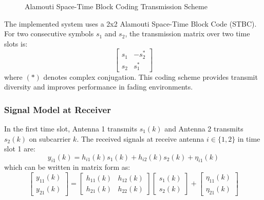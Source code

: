 \documentclass[a4paper]{article}
\begin{document}
\begin{figure}[H]
{%
}
\caption{Alamouti Space-Time Block Coding Transmission Scheme}
\label{fig:alamouti_scheme}
\end{figure}
The implemented system uses a 2x2 Alamouti Space-Time Block Code (STBC). For two consecutive symbols $s_1$ and $s_2$, the transmission matrix over two time slots is:
\begin{equation}
\begin{bmatrix}
s_1 & -s_2^* \\
s_2 & s_1^*
\end{bmatrix}
\end{equation}
where $(*)$ denotes complex conjugation. This coding scheme provides transmit diversity and improves performance in fading environments.

\subsubsection{Signal Model at Receiver}
In the first time slot, Antenna 1 transmits $s_1(k)$ and Antenna 2 transmits $s_2(k)$ on subcarrier $k$. The received signals at receive antenna $i \in \{1, 2\}$ in time slot 1 are:
\begin{equation}
y_{i1}(k) = h_{i1}(k) s_1(k) + h_{i2}(k) s_2(k) + \eta_{i1}(k)
\end{equation}
which can be written in matrix form as:
\begin{equation}
\begin{bmatrix} y_{11}(k) \\ y_{21}(k) \end{bmatrix} = \begin{bmatrix} h_{11}(k) & h_{12}(k) \\ h_{21}(k) & h_{22}(k) \end{bmatrix} \begin{bmatrix} s_1(k) \\ s_2(k) \end{bmatrix} + \begin{bmatrix} \eta_{11}(k) \\ \eta_{21}(k) \end{bmatrix}
\end{equation}
\end{document}
